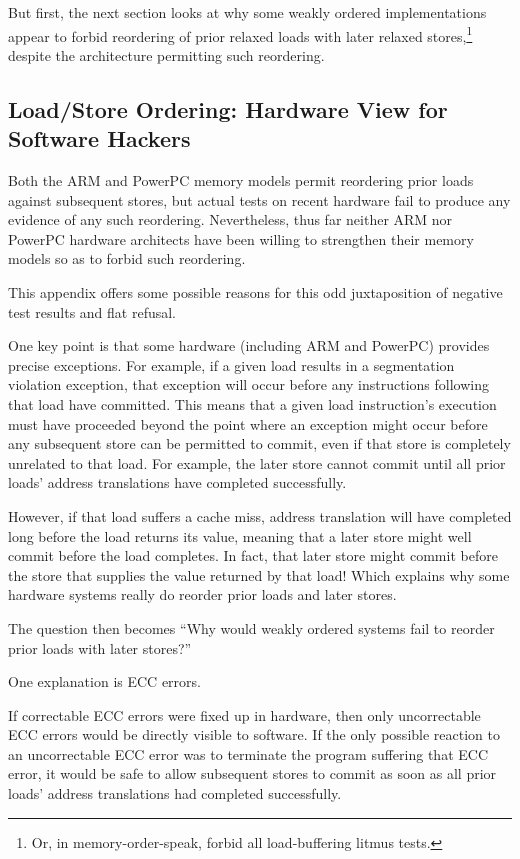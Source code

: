 \documentclass[10]{article}
\begin{document}
But first, the next section looks at why some weakly ordered
implementations appear to forbid reordering of prior relaxed loads with
later relaxed stores,\footnote{
	Or, in memory-order-speak, forbid all load-buffering litmus tests.}
despite the architecture permitting such reordering.

\subsection{Load/Store Ordering: Hardware View for Software Hackers}
\label{sec:Load/Store Ordering: Hardware View for Software Hackers}


Both the ARM and PowerPC memory models permit reordering prior loads
against subsequent stores, but actual tests on recent hardware fail to
produce any evidence of any such reordering.
Nevertheless, thus far neither ARM nor PowerPC hardware architects
have been willing to strengthen their memory models so as to forbid
such reordering.

This appendix offers some possible reasons for this odd juxtaposition
of negative test results and flat refusal.

One key point is that some hardware (including ARM and PowerPC) provides
precise exceptions.
For example, if a given load results in a segmentation violation
exception, that exception will occur before any instructions following
that load have committed.
This means that a given load instruction's execution must have proceeded
beyond the point where an exception might occur before any subsequent
store can be permitted to commit, even if that store is completely
unrelated to that load.
For example, the later store cannot commit until all prior loads' address
translations have completed successfully.

However, if that load suffers a cache miss, address translation will have
completed long before the load returns its value, meaning that a later
store might well commit before the load completes.
In fact, that later store might commit before the store that supplies the
value returned by that load!
Which explains why some hardware systems really do reorder prior loads
and later stores.

The question then becomes ``Why would weakly ordered systems fail to
reorder prior loads with later stores?''

One explanation is ECC errors.

If correctable ECC errors were fixed up in hardware, then only uncorrectable
ECC errors would be directly visible to software.
If the only possible reaction to an uncorrectable ECC error was to
terminate the program suffering that ECC error, it would be safe to
allow subsequent stores to commit as soon as all prior loads' address
translations had completed successfully.
\end{document}
